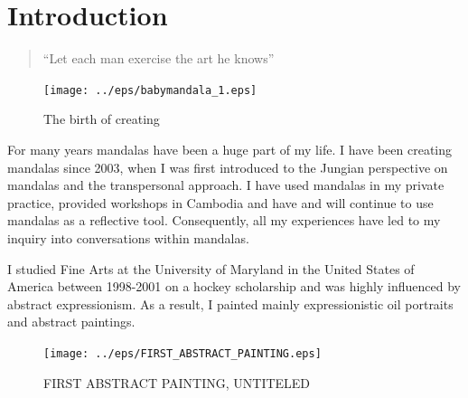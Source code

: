 \chapter{Introduction}
\begin{quote}
“Let each man exercise the art he knows” 
\end{quote}


\begin{figure}[htbp]
\begin{center}
\texttt{[image: ../eps/babymandala\_1.eps]} 
\caption{The birth of creating}
\label{label}
\end{center}
\end{figure}


\newpage 


For many years mandalas have been a huge part of my life. I have been creating mandalas since 2003, when I was first introduced to the Jungian perspective on mandalas and the transpersonal approach. I have used mandalas in my private practice, provided workshops in Cambodia and have and will continue to use mandalas as a reflective tool. Consequently, all my experiences have led to my inquiry into conversations within mandalas.

I studied Fine Arts at the University of Maryland in the United States of America between 1998-2001 on a hockey scholarship and was highly influenced by abstract expressionism. As a result, I painted mainly expressionistic oil portraits and abstract paintings.


\begin{figure}[htbp]
\begin{center}
\texttt{[image: ../eps/FIRST\_ABSTRACT\_PAINTING.eps]}
\caption{FIRST ABSTRACT PAINTING, UNTITELED}
\label{label}
\end{center}
\end{figure}
\newpage 

